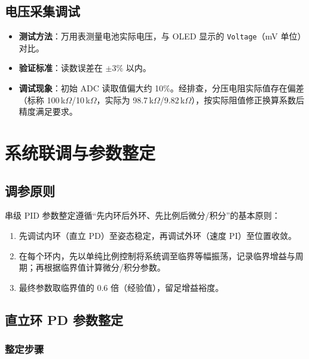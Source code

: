 \documentclass[12pt,a4paper,UTF8]{ctexrep}
\begin{document}
\subsection{电压采集调试}

\begin{itemize}
  \item \textbf{测试方法}：万用表测量电池实际电压，与 OLED 显示的 \texttt{Voltage}（mV 单位）对比。
  \item \textbf{验证标准}：读数误差在 $\pm 3\%$ 以内。
  \item \textbf{调试现象}：初始 ADC 读取值偏大约 10\%。经排查，分压电阻实际值存在偏差（标称 100\,k$\Omega$/10\,k$\Omega$，实际为 98.7\,k$\Omega$/9.82\,k$\Omega$），按实际阻值修正换算系数后精度满足要求。
\end{itemize}

\section{系统联调与参数整定}

\subsection{调参原则}

串级 PID 参数整定遵循“先内环后外环、先比例后微分/积分”的基本原则：

\begin{enumerate}
  \item 先调试内环（直立 PD）至姿态稳定，再调试外环（速度 PI）至位置收敛。
  \item 在每个环内，先以单纯比例控制将系统调至临界等幅振荡，记录临界增益与周期；再根据临界值计算微分/积分参数。
  \item 最终参数取临界值的 0.6 倍（经验值），留足增益裕度。
\end{enumerate}

\subsection{直立环 PD 参数整定}

\subsubsection{整定步骤}
\end{document}
